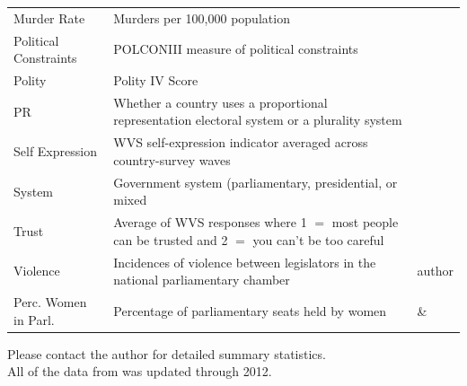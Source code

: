\documentclass[a4paper]{article}\usepackage[]{graphicx}\usepackage[]{color}
\begin{document}
\begin{table}[!h]
\begin{center}
\begin{tabular}{l m{7cm} m{3.5cm}}
            Murder Rate & Murders per 100,000 population & \cite{UNMurder2013} \\
            Political Constraints & POLCONIII measure of political constraints & \cite[][updated through 2011]{Henisz2004} \\
            Polity & Polity IV Score & \cite{Marshall2009} \\
            PR & Whether a country uses a proportional representation electoral system or a plurality system & \cite{DPI2001} \\
            Self Expression & WVS self-expression indicator averaged across country-survey waves & \cite{WVS2009} \\
            System & Government system (parliamentary, presidential, or mixed & \cite{DPI2001} \\
            Trust & Average of WVS responses where 1 $=$ most people can be trusted and 2 $=$ you can't be too careful & \cite{WVS2009} \\
            Violence & Incidences of violence between legislators in the national parliamentary chamber & author \\
            Perc. Women in Parl. & Percentage of parliamentary seats held by women & \cite{WomParCrossNat} \& \cite{IPU2013} \\
            \hline

    \end{tabular}
    \end{center}
    \begin{singlespace}
        Please contact the author for detailed summary statistics. \\
        All of the data from \cite{DPI2001} was updated through 2012.
    \end{singlespace}

\end{table}
\end{document}
